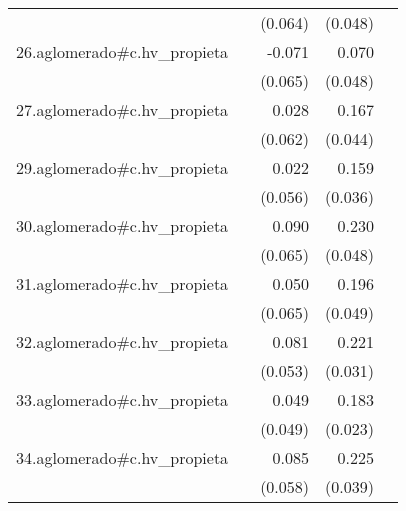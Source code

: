 {\begin{longtable}{l*{4}{D{.}{.}{-1}}}
            &                     &     (0.064)         &     (0.048)         &                     \\
\addlinespace
26.aglomerado#c.hv\_propieta&                     &      -0.071         &       0.070         &                     \\
            &                     &     (0.065)         &     (0.048)         &                     \\
\addlinespace
27.aglomerado#c.hv\_propieta&                     &       0.028         &       0.167\sym{***}&                     \\
            &                     &     (0.062)         &     (0.044)         &                     \\
\addlinespace
29.aglomerado#c.hv\_propieta&                     &       0.022         &       0.159\sym{***}&                     \\
            &                     &     (0.056)         &     (0.036)         &                     \\
\addlinespace
30.aglomerado#c.hv\_propieta&                     &       0.090         &       0.230\sym{***}&                     \\
            &                     &     (0.065)         &     (0.048)         &                     \\
\addlinespace
31.aglomerado#c.hv\_propieta&                     &       0.050         &       0.196\sym{***}&                     \\
            &                     &     (0.065)         &     (0.049)         &                     \\
\addlinespace
32.aglomerado#c.hv\_propieta&                     &       0.081         &       0.221\sym{***}&                     \\
            &                     &     (0.053)         &     (0.031)         &                     \\
\addlinespace
33.aglomerado#c.hv\_propieta&                     &       0.049         &       0.183\sym{***}&                     \\
            &                     &     (0.049)         &     (0.023)         &                     \\
\addlinespace
34.aglomerado#c.hv\_propieta&                     &       0.085         &       0.225\sym{***}&                     \\
            &                     &     (0.058)         &     (0.039)         &                     \\

\end{longtable}}
